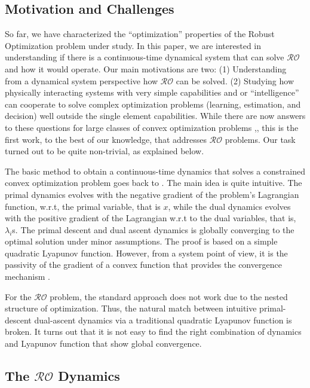 \documentclass[journal,twoside,web]{ieeecolor}
\newcommand{\rev}[1]{\textcolor{revisionblue}{#1}}
\begin{document}
\subsection*{\rev{Motivation and Challenges}}

So far, we have characterized the ``optimization'' properties of the Robust Optimization problem under study. In this paper, we are interested in understanding if there is a continuous-time dynamical system that can solve $\mathcal{RO}$ and how it would operate. Our main motivations are two: (1) Understanding from a dynamical system perspective how $\mathcal{RO}$ can be solved. (2) Studying how physically interacting systems with very simple capabilities and or ``intelligence'' can cooperate to solve complex optimization problems (learning, estimation, and decision) well outside the single element capabilities. While there are now answers to these questions for large classes of convex optimization problems \cite{feijer2010},\cite{wang2011}, this is the first work, to the best of our knowledge, that addresses $\mathcal{RO}$ problems. Our task turned out to be quite non-trivial, as explained below.

The basic method to obtain a continuous-time dynamics that solves a constrained convex optimization problem goes back to \cite{arrow1958}. The main idea is quite intuitive. The primal dynamics evolves with the negative gradient of the problem's Lagrangian function, w.r.t, the primal variable, that is $x$, while the dual dynamics evolves with the positive gradient of the Lagrangian w.r.t to the dual variables, that is, $\lambda_i$s. The primal descent and dual ascent dynamics is globally converging to the optimal solution under minor assumptions. The proof is based on a simple quadratic Lyapunov function. However, from a system point of view, it is the passivity of the gradient of a convex function that provides the convergence mechanism \cite{simpson2016,kosaraju2018}.

For the $\mathcal{RO}$ problem, the standard approach does not work due to the nested structure of optimization. Thus, the natural match between intuitive primal-descent dual-ascent dynamics via a traditional quadratic Lyapunov function is broken. It turns out that it is not easy to find the right combination of dynamics and Lyapunov function that show global convergence.

\subsection*{\rev{The $\mathcal{RO}$ Dynamics}}
\end{document}
